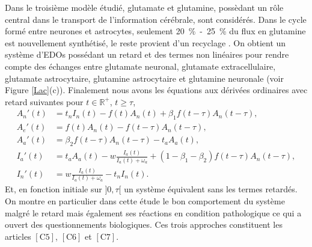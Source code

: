 \documentclass[a4paper, 12pt, twoside, openright]{article}
\begin{document}
\begin{itemize}
\begin{itemize}
Dans le troisième modèle étudié, glutamate et glutamine, possèdant un rôle central dans le transport de l'information cérébrale, sont considérés. Dans le cycle formé entre neurones et astrocytes,  seulement 20~\%~-~25~\% du flux en glutamine est nouvellement synthétisé, le reste provient d'un recyclage \cite{hertz2017}. On obtient un système d'EDOs possédant un retard et des termes non linéaires pour rendre compte des échanges entre glutamate neuronal, glutamate extracellulaire, glutamate astrocytaire, glutamine astrocytaire et glutamine neuronale (voir Figure \ref{Lac}(c)). Finalement nous avons les équations aux dérivées ordinaires avec retard suivantes pour $t \in \mathbb{R}^+$, $t\geqslant \tau$,
\vspace{-0.25cm}
\begin{align*}
A_n'(t) &= t_nI_n(t)-f(t)A_n(t)+\beta_1f(t-\tau)A_n(t-\tau),\\
A_e'(t) &=f(t)A_n(t)-f(t-\tau)A_n(t-\tau),\\
A_a'(t) &=\beta_2 f(t-\tau)A_n(t-\tau)-t_aA_a(t),\\
I_a'(t) &= t_aA_a(t)-w\frac{I_a(t)}{I_a(t)+\omega_a}+(1-\beta_1-\beta_2)f(t-\tau)A_n(t-\tau),\\
I_n'(t) &= w\frac{I_a(t)}{I_a(t)+\omega_a}-t_nI_n(t). 
\end{align*}
\vspace{-0.25cm}
Et, en fonction initiale sur $]0,\tau[$ un système équivalent sans les termes retardés. On montre en particulier dans cette étude le bon comportement du système malgré le retard mais également ses réactions en condition pathologique ce qui a ouvert des questionnements biologiques.
Ces trois approches constituent les articles $\left[ \text{C5} \right]$, $\left[ \text{C6} \right]$ et $\left[ \text{C7} \right]$.


\end{itemize}
\end{itemize}
\end{document}
